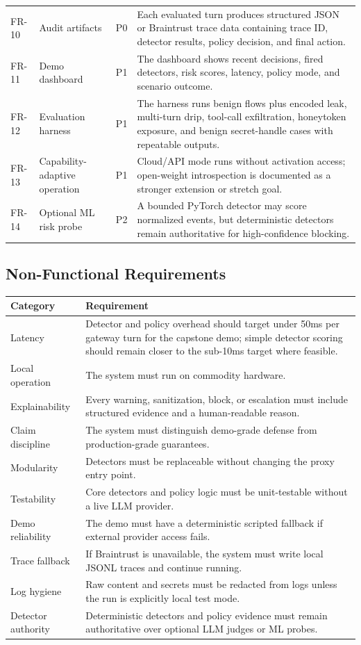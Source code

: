 \documentclass[11pt,letterpaper]{article}
\begin{document}
\begin{longtable}{p{}p{}p{}p{}}
FR-10 & Audit artifacts & P0 & Each evaluated turn produces structured JSON or Braintrust trace data containing trace ID, detector results, policy decision, and final action. \\
FR-11 & Demo dashboard & P1 & The dashboard shows recent decisions, fired detectors, risk scores, latency, policy mode, and scenario outcome. \\
FR-12 & Evaluation harness & P1 & The harness runs benign flows plus encoded leak, multi-turn drip, tool-call exfiltration, honeytoken exposure, and benign secret-handle cases with repeatable outputs. \\
FR-13 & Capability-adaptive operation & P1 & Cloud/API mode runs without activation access; open-weight introspection is documented as a stronger extension or stretch goal. \\
FR-14 & Optional ML risk probe & P2 & A bounded PyTorch detector may score normalized events, but deterministic detectors remain authoritative for high-confidence blocking. \\
\bottomrule
\end{longtable}

\subsection{Non-Functional Requirements}

\begin{longtable}{p{}p{}}
\toprule
\textbf{Category} & \textbf{Requirement} \\
\midrule
Latency & Detector and policy overhead should target under 50ms per gateway turn for the capstone demo; simple detector scoring should remain closer to the sub-10ms target where feasible. \\
Local operation & The system must run on commodity hardware. \\
Explainability & Every warning, sanitization, block, or escalation must include structured evidence and a human-readable reason. \\
Claim discipline & The system must distinguish demo-grade defense from production-grade guarantees. \\
Modularity & Detectors must be replaceable without changing the proxy entry point. \\
Testability & Core detectors and policy logic must be unit-testable without a live LLM provider. \\
Demo reliability & The demo must have a deterministic scripted fallback if external provider access fails. \\
Trace fallback & If Braintrust is unavailable, the system must write local JSONL traces and continue running. \\
Log hygiene & Raw content and secrets must be redacted from logs unless the run is explicitly local test mode. \\
Detector authority & Deterministic detectors and policy evidence must remain authoritative over optional LLM judges or ML probes. \\
\bottomrule
\end{longtable}
\end{document}
